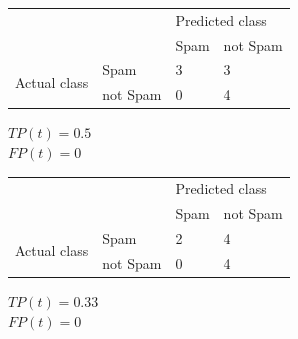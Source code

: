 \documentclass[a4paper]{article}
\theoremstyle{definition}
\newenvironment{soln}{
    \leavevmode\color{blue}\ignorespaces
}{}
\begin{document}
\begin{enumerate}
\begin{enumerate}
\begin{soln}
                  \begin{center}
                     \label{tab:title}
                    \begin{tabular}{l l | l l}
                                                    &          & \multicolumn{2}{l}{Predicted class}            \\
                                                    &          & Spam                                & not Spam \\
                      \hline
                      \multirow{2}{*}{Actual class} & Spam     & 3                                   & 3        \\
                                                    & not Spam & 0                                   & 4
                    \end{tabular}
                  \end{center}
                  $TP(t) = 0.5$\\
                  $FP(t) = 0$

                  \begin{center}
                     \label{tab:title}
                    \begin{tabular}{l l | l l}
                                                    &          & \multicolumn{2}{l}{Predicted class}            \\
                                                    &          & Spam                                & not Spam \\
                      \hline
                      \multirow{2}{*}{Actual class} & Spam     & 2                                   & 4        \\
                                                    & not Spam & 0                                   & 4
                    \end{tabular}
                  \end{center}
                  $TP(t) = 0.33$\\
                  $FP(t) = 0$


\end{soln}
\end{enumerate}
\end{enumerate}
\end{document}
